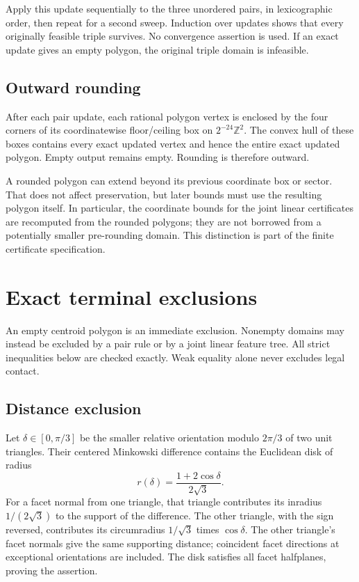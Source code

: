 \documentclass[11pt]{article}
\begin{document}
Apply this update sequentially to the three unordered pairs, in lexicographic order, then repeat for a second sweep. Induction over updates shows that every originally feasible triple survives. No convergence assertion is used. If an exact update gives an empty polygon, the original triple domain is infeasible.

\subsection{Outward rounding}

After each pair update, each rational polygon vertex is enclosed by the four corners of its coordinatewise floor/ceiling box on $2^{-24}\mathbb Z^2$. The convex hull of these boxes contains every exact updated vertex and hence the entire exact updated polygon. Empty output remains empty. Rounding is therefore outward.

A rounded polygon can extend beyond its previous coordinate box or sector. That does not affect preservation, but later bounds must use the resulting polygon itself. In particular, the coordinate bounds for the joint linear certificates are recomputed from the rounded polygons; they are not borrowed from a potentially smaller pre-rounding domain. This distinction is part of the finite certificate specification.

\section{Exact terminal exclusions}\label{sec:terminals}

An empty centroid polygon is an immediate exclusion. Nonempty domains may instead be excluded by a pair rule or by a joint linear feature tree. All strict inequalities below are checked exactly. Weak equality alone never excludes legal contact.

\subsection{Distance exclusion}

Let $\delta\in[0,\pi/3]$ be the smaller relative orientation modulo $2\pi/3$ of two unit triangles. Their centered Minkowski difference contains the Euclidean disk of radius
\begin{equation}\label{eq:distance-radius}
 r(\delta)=\frac{1+2\cos\delta}{2\sqrt3}.
\end{equation}
For a facet normal from one triangle, that triangle contributes its inradius $1/(2\sqrt3)$ to the support of the difference. The other triangle, with the sign reversed, contributes its circumradius $1/\sqrt3$ times $\cos\delta$. The other triangle's facet normals give the same supporting distance; coincident facet directions at exceptional orientations are included. The disk satisfies all facet halfplanes, proving the assertion.
\end{document}
